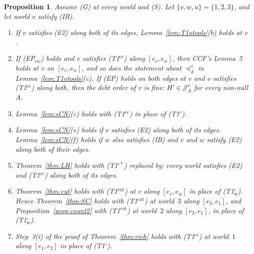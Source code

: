 \documentclass[11pt]{article}
\newtheorem{proposition}[theorem]{Proposition}
\theoremstyle{definition}\newtheorem{definition}[theorem]{Definition}
\theoremstyle{remark}\newtheorem{remark}[theorem]{Remark}
\newcommand{\Jid}{\mathcal J}
\newcommand{\Tw}{\textup{(T1$^\circ_{\mathrm w}$)}}
\newcommand{\To}{\textup{(T1$^\circ$)}}
\newcommand{\Tos}{\textup{(T1$^{\circ*}$)}}
\newcommand{\Tcc}{\textup{(T1$^{\mathrm{cc}}$)}}
\newcommand{\Tcut}{\textup{(T1$^{\mathrm{cut}}$)}}
\begin{document}
\begin{proposition}\label{prop:audit}
Assume (G) at every world and (S). Let $\{v,w,u\}=\{1,2,3\}$, and let world
$v$ satisfy (IB).
\begin{enumerate}[label=(\alph*),leftmargin=*,itemsep=2pt]
\item If $v$ satisfies (E2) along both of its edges,
Lemma~\ref{lem:T1otools}(b) holds at $v$.
\item If (EP$_{vw}$) holds and $v$ satisfies \Tcc{} along $[e_v,e_w]$, then
CCF's Lemma~5 holds at $v$ on $[e_v,e_w]$, and so does the statement about
$\preceq^v_d$ in Lemma~\ref{lem:T1otools}(c). If (EP) holds on both edges at
$v$ and $v$ satisfies \Tcc{} along both, then the debt order of $v$ is fine:
$H'\in\Jid^v_A$ for every non-null $A$.
\item Lemma~\ref{lem:sCN}(c) holds with \Tcc{} in place of \To.
\item Lemma~\ref{lem:sCN}(e) holds if $v$ satisfies (E2) along both of its
edges. Lemma~\ref{lem:sCN}(f) holds if $w$ also satisfies (IB) and $v$ and
$w$ satisfy (E2) along both of their edges.
\item Theorem~\ref{thm:LH} holds with \Tos{} replaced by: every world
satisfies (E2) and \Tcc{} along both of its edges.
\item Theorem~\ref{thm:cut} holds with \Tcut{} at $v$ along $[e_v,e_w]$ in
place of \Tw. Hence Theorem~\ref{thm:SC} holds with \Tcut{} at world~$3$
along $[e_3,e_1]$, and Proposition~\ref{prop:count2} with \Tcut{} at
world~$2$ along $[e_2,e_1]$, in place of \Tw.
\item Step~3(i) of the proof of Theorem~\ref{thm:rich} holds with \Tcc{} at
world~$1$ along $[e_1,e_2]$ in place of \To.
\end{enumerate}
\end{proposition}
\end{document}

